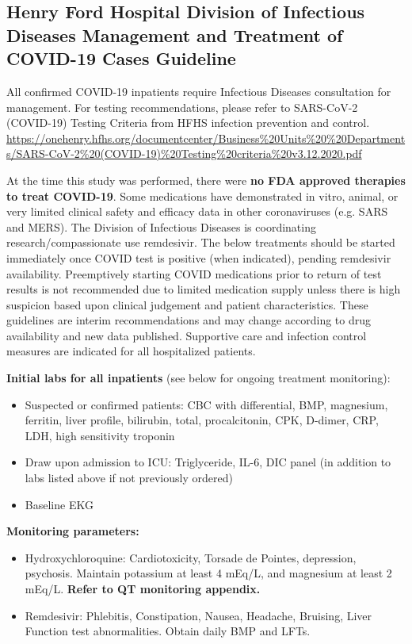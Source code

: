 \subsection{Henry Ford Hospital Division of Infectious Diseases Management and Treatment of COVID-19 Cases Guideline}


All confirmed COVID-19 inpatients require Infectious Diseases consultation for management. For testing recommendations, please refer to SARS-CoV-2 (COVID-19) Testing Criteria from HFHS infection prevention and control. \url{https://onehenry.hfhs.org/documentcenter/Business%20Units%20%20Departments/SARS-CoV-2%20(COVID-19)%20Testing%20criteria%20v3.12.2020.pdf} 

At the time this  study was performed, there were \textbf{no FDA approved therapies to treat COVID-19}. Some medications have demonstrated in vitro, animal, or very limited clinical safety and efficacy data in other coronaviruses (e.g. SARS and MERS). The Division of Infectious Diseases is coordinating research/compassionate use remdesivir. The below treatments should be started immediately once COVID test is positive (when indicated), pending remdesivir availability.  Preemptively starting COVID medications prior to return of test results is not recommended due to limited medication supply unless there is high suspicion based upon clinical judgement and patient characteristics.  These guidelines are interim recommendations and may change according to drug availability and new data published. Supportive care and infection control measures are indicated for all hospitalized patients.

\textbf{Initial labs for all inpatients} (see below for ongoing treatment monitoring): 
\begin{itemize}
\item Suspected or confirmed patients: CBC with differential, BMP, magnesium, ferritin, liver profile, bilirubin, total, procalcitonin, CPK, D-dimer, CRP, LDH, high sensitivity troponin
\item Draw upon admission to ICU: Triglyceride, IL-6, DIC panel (in addition to labs listed above if not previously ordered)
\item Baseline EKG
\end{itemize}

\textbf{Monitoring parameters:}
\begin{itemize}
\item Hydroxychloroquine: Cardiotoxicity, Torsade de Pointes, depression, psychosis. Maintain potassium at least 4 mEq/L, and magnesium at least 2 mEq/L. \textbf{Refer to QT monitoring appendix.} 
\item Remdesivir: Phlebitis, Constipation, Nausea, Headache, Bruising, Liver Function test abnormalities. Obtain daily BMP and LFTs. 
\end{itemize}




